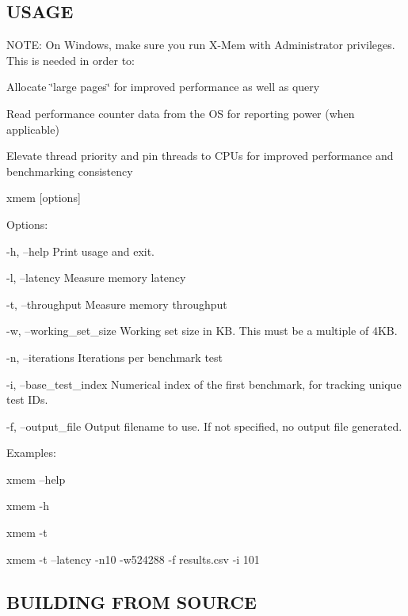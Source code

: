  \subsection*{U\-S\-A\-G\-E }

N\-O\-T\-E\-: On Windows, make sure you run X-\/\-Mem with Administrator privileges. This is needed in order to\-:
\begin{DoxyItemize}
\item Allocate \char`\"{}large pages\char`\"{} for improved performance as well as query
\item Read performance counter data from the O\-S for reporting power (when applicable)
\item Elevate thread priority and pin threads to C\-P\-Us for improved performance and benchmarking consistency
\end{DoxyItemize}

xmem \mbox{[}options\mbox{]}

Options\-: \begin{DoxyVerb}-h, --help                Print usage and exit.

-l, --latency             Measure memory latency

-t, --throughput          Measure memory throughput

-w, --working_set_size    Working set size in KB. This must be a multiple of
                          4KB.

-n, --iterations          Iterations per benchmark test

-i, --base_test_index     Numerical index of the first benchmark, for
                          tracking unique test IDs.

-f, --output_file         Output filename to use. If not specified, no
                          output file generated.
\end{DoxyVerb}


Examples\-: \begin{DoxyVerb}xmem --help

xmem -h

xmem -t

xmem -t --latency -n10 -w524288 -f results.csv -i 101
\end{DoxyVerb}




 \subsection*{B\-U\-I\-L\-D\-I\-N\-G F\-R\-O\-M S\-O\-U\-R\-C\-E }

